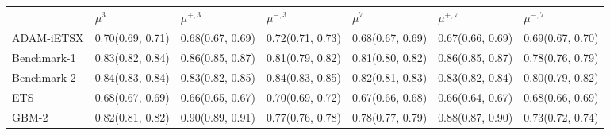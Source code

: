 \begin{tabularx}{\textwidth}{X p{} p{} p{} p{} p{} p{}}
\toprule
 & $\mu^{3}$ & $\mu^{+, 3}$ & $\mu^{-, 3}$ & $\mu^{7}$ & $\mu^{+, 7}$ & $\mu^{-, 7}$ \\
\midrule
ADAM-iETSX & {0.70\newline(0.69, 0.71)} & {0.68\newline(0.67, 0.69)} & {0.72\newline(0.71, 0.73)} & {0.68\newline(0.67, 0.69)} & {0.67\newline(0.66, 0.69)} & {0.69\newline(0.67, 0.70)} \\
Benchmark-1 & {0.83\newline(0.82, 0.84)} & {0.86\newline(0.85, 0.87)} & {0.81\newline(0.79, 0.82)} & {0.81\newline(0.80, 0.82)} & {0.86\newline(0.85, 0.87)} & {0.78\newline(0.76, 0.79)} \\
Benchmark-2 & {0.84\newline(0.83, 0.84)} & {0.83\newline(0.82, 0.85)} & {0.84\newline(0.83, 0.85)} & {0.82\newline(0.81, 0.83)} & {0.83\newline(0.82, 0.84)} & {0.80\newline(0.79, 0.82)} \\
ETS & {0.68\newline(0.67, 0.69)} & {0.66\newline(0.65, 0.67)} & {0.70\newline(0.69, 0.72)} & {0.67\newline(0.66, 0.68)} & {0.66\newline(0.64, 0.67)} & {0.68\newline(0.66, 0.69)} \\
GBM-2 & {0.82\newline(0.81, 0.82)} & {0.90\newline(0.89, 0.91)} & {0.77\newline(0.76, 0.78)} & {0.78\newline(0.77, 0.79)} & {0.88\newline(0.87, 0.90)} & {0.73\newline(0.72, 0.74)} \\

\end{tabularx}
